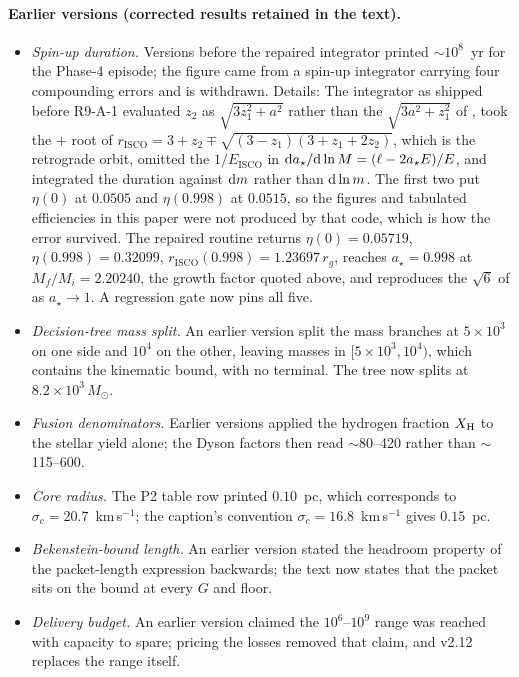 \documentclass[11pt]{article}
\newcommand{\msun}{\ensuremath{M_\odot}}
\newcommand{\astar}{\ensuremath{a_\star}}
\begin{document}
\paragraph{Earlier versions (corrected results retained in the text).}
\begin{itemize}
\item \emph{Spin-up duration.} Versions before the repaired integrator printed $\sim$$10^{8}$~yr for the Phase-4 episode; the figure came from a spin-up integrator carrying four compounding errors and is withdrawn. Details: The integrator as shipped before R9-A-1 evaluated $z_2$ as $\sqrt{3z_1^{2}+a^{2}}$ rather than the $\sqrt{3a^{2}+z_1^{2}}$ of \citet{BardeenPressTeukolsky1972}, took the $+$ root of $r_{\mathrm{ISCO}} = 3+z_2 \mp \sqrt{(3-z_1)(3+z_1+2z_2)}$, which is the retrograde orbit, omitted the $1/E_{\mathrm{ISCO}}$ in ${\rm d}\astar/{\rm d}\ln M = (\ell - 2\astar E)/E$, and integrated the duration against ${\rm d}m$ rather than ${\rm d}\ln m$. The first two put $\eta(0)$ at $0.0505$ and $\eta(0.998)$ at $0.0515$, so the figures and tabulated efficiencies in this paper were not produced by that code, which is how the error survived. The repaired routine returns $\eta(0) = 0.05719$, $\eta(0.998) = 0.32099$, $r_{\mathrm{ISCO}}(0.998) = 1.23697\,r_g$, reaches $\astar = 0.998$ at $M_f/M_i = 2.20240$, the growth factor quoted above, and reproduces the $\sqrt{6}$ of \citet{Bardeen1970} as $\astar \to 1$. A regression gate now pins all five.
\item \emph{Decision-tree mass split.} An earlier version split the mass branches at $5\times10^{3}$ on one side and $10^{4}$ on the other, leaving masses in $[5\times10^{3}, 10^{4})$, which contains the kinematic bound, with no terminal. The tree now splits at $8.2\times10^{3}\,\msun$.
\item \emph{Fusion denominators.} Earlier versions applied the hydrogen fraction $X_{\rm H}$ to the stellar yield alone; the Dyson factors then read $\sim$80--420 rather than $\sim$115--600.
\item \emph{Core radius.} The P2 table row printed $0.10$~pc, which corresponds to $\sigma_c = 20.7$~km\,s$^{-1}$; the caption's convention $\sigma_c = 16.8$~km\,s$^{-1}$ gives $0.15$~pc.
\item \emph{Bekenstein-bound length.} An earlier version stated the headroom property of the packet-length expression backwards; the text now states that the packet sits on the bound at every $G$ and floor.
\item \emph{Delivery budget.} An earlier version claimed the $10^{6}$--$10^{9}$ range was reached with capacity to spare; pricing the losses removed that claim, and v2.12 replaces the range itself.
$$
\end{itemize}
\end{document}
